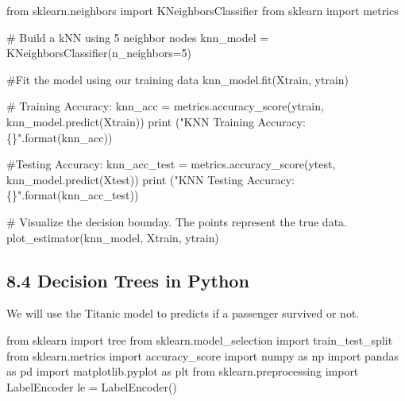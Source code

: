 \documentclass[
  letterpaper,
  DIV=11,
  numbers=noendperiod]{scrartcl}
\newenvironment{Shaded}{\begin{snugshade}}{\end{snugshade}}
\newcommand{\BuiltInTok}[1]{\textcolor[rgb]{0.00,0.23,0.31}{#1}}
\newcommand{\CommentTok}[1]{\textcolor[rgb]{0.37,0.37,0.37}{#1}}
\newcommand{\DecValTok}[1]{\textcolor[rgb]{0.68,0.00,0.00}{#1}}
\newcommand{\ImportTok}[1]{\textcolor[rgb]{0.00,0.46,0.62}{#1}}
\newcommand{\NormalTok}[1]{\textcolor[rgb]{0.00,0.23,0.31}{#1}}
\newcommand{\OperatorTok}[1]{\textcolor[rgb]{0.37,0.37,0.37}{#1}}
\newcommand{\SpecialCharTok}[1]{\textcolor[rgb]{0.37,0.37,0.37}{#1}}
\newcommand{\StringTok}[1]{\textcolor[rgb]{0.13,0.47,0.30}{#1}}
\begin{document}
\begin{Shaded}
\begin{Highlighting}[]
\ImportTok{from}\NormalTok{ sklearn.neighbors }\ImportTok{import}\NormalTok{ KNeighborsClassifier}
\ImportTok{from}\NormalTok{ sklearn }\ImportTok{import}\NormalTok{ metrics}

\CommentTok{\# Build a kNN using 5 neighbor nodes}
\NormalTok{knn\_model }\OperatorTok{=}\NormalTok{ KNeighborsClassifier(n\_neighbors}\OperatorTok{=}\DecValTok{5}\NormalTok{)}

\CommentTok{\#Fit the model using our training data}
\NormalTok{knn\_model.fit(Xtrain, ytrain)}

\CommentTok{\# Training Accuracy:}
\NormalTok{knn\_acc }\OperatorTok{=}\NormalTok{ metrics.accuracy\_score(ytrain, knn\_model.predict(Xtrain))}
\BuiltInTok{print}\NormalTok{ (}\StringTok{"KNN Training Accuracy: }\SpecialCharTok{\{\}}\StringTok{"}\NormalTok{.}\BuiltInTok{format}\NormalTok{(knn\_acc))}

\CommentTok{\#Testing Accuracy:}
\NormalTok{knn\_acc\_test }\OperatorTok{=}\NormalTok{ metrics.accuracy\_score(ytest, knn\_model.predict(Xtest))}
\BuiltInTok{print}\NormalTok{ (}\StringTok{"KNN Testing Accuracy: }\SpecialCharTok{\{\}}\StringTok{"}\NormalTok{.}\BuiltInTok{format}\NormalTok{(knn\_acc\_test))}

\CommentTok{\# Visualize the decision bounday. The points represent the true data. }
\NormalTok{plot\_estimator(knn\_model, Xtrain, ytrain)}
\end{Highlighting}
\end{Shaded}

\subsection{8.4 Decision Trees in
Python}\label{decision-trees-in-python}

We will use the Titanic model to predicts if a passenger survived or
not.

\begin{Shaded}
\begin{Highlighting}[]
\ImportTok{from}\NormalTok{ sklearn }\ImportTok{import}\NormalTok{ tree}
\ImportTok{from}\NormalTok{ sklearn.model\_selection }\ImportTok{import}\NormalTok{ train\_test\_split}
\ImportTok{from}\NormalTok{ sklearn.metrics }\ImportTok{import}\NormalTok{ accuracy\_score}
\ImportTok{import}\NormalTok{ numpy }\ImportTok{as}\NormalTok{ np}
\ImportTok{import}\NormalTok{ pandas }\ImportTok{as}\NormalTok{ pd}
\ImportTok{import}\NormalTok{ matplotlib.pyplot }\ImportTok{as}\NormalTok{ plt}
\ImportTok{from}\NormalTok{ sklearn.preprocessing }\ImportTok{import}\NormalTok{ LabelEncoder}
\NormalTok{le }\OperatorTok{=}\NormalTok{ LabelEncoder()}
\end{Highlighting}
\end{Shaded}
\end{document}
